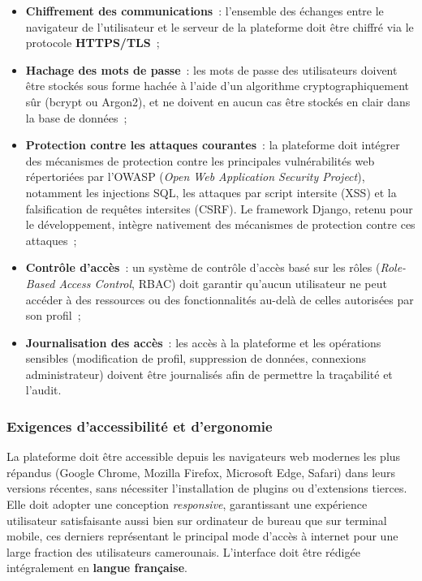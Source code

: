 \documentclass[12pt, a4paper, oneside]{report}
\begin{document}
	\begin{itemize}
		\item \textbf{Chiffrement des communications}~: l'ensemble des
		échanges entre le navigateur de l'utilisateur et le serveur de
		la plateforme doit être chiffré via le protocole
		\textbf{HTTPS/TLS}~;
		
		\item \textbf{Hachage des mots de passe}~: les mots de passe
		des utilisateurs doivent être stockés sous forme hachée à l'aide
		d'un algorithme cryptographiquement sûr (bcrypt ou Argon2),
		et ne doivent en aucun cas être stockés en clair dans la base
		de données~;
		
		\item \textbf{Protection contre les attaques courantes}~: la
		plateforme doit intégrer des mécanismes de protection contre
		les principales vulnérabilités web répertoriées par l'OWASP
		(\textit{Open Web Application Security Project}), notamment les
		injections SQL, les attaques par script intersite (XSS) et
		la falsification de requêtes intersites (CSRF). Le framework
		Django, retenu pour le développement, intègre nativement des
		mécanismes de protection contre ces attaques~;
		
		\item \textbf{Contrôle d'accès}~: un système de contrôle
		d'accès basé sur les rôles (\textit{Role-Based Access Control},
		RBAC) doit garantir qu'aucun utilisateur ne peut accéder à des
		ressources ou des fonctionnalités au-delà de celles autorisées
		par son profil~;
		
		\item \textbf{Journalisation des accès}~: les accès à la
		plateforme et les opérations sensibles (modification de profil,
		suppression de données, connexions administrateur) doivent
		être journalisés afin de permettre la traçabilité et l'audit.
	\end{itemize}
	
	\subsubsection{Exigences d'accessibilité et d'ergonomie}
	
	La plateforme doit être accessible depuis les navigateurs web
	modernes les plus répandus (Google Chrome, Mozilla Firefox,
	Microsoft Edge, Safari) dans leurs versions récentes, sans
	nécessiter l'installation de plugins ou d'extensions tierces.
	Elle doit adopter une conception \textit{responsive}, garantissant
	une expérience utilisateur satisfaisante aussi bien sur ordinateur
	de bureau que sur terminal mobile, ces derniers représentant le
	principal mode d'accès à internet pour une large fraction des
	utilisateurs camerounais. L'interface doit être rédigée intégralement
	en \textbf{langue française}.
	
\end{document}
